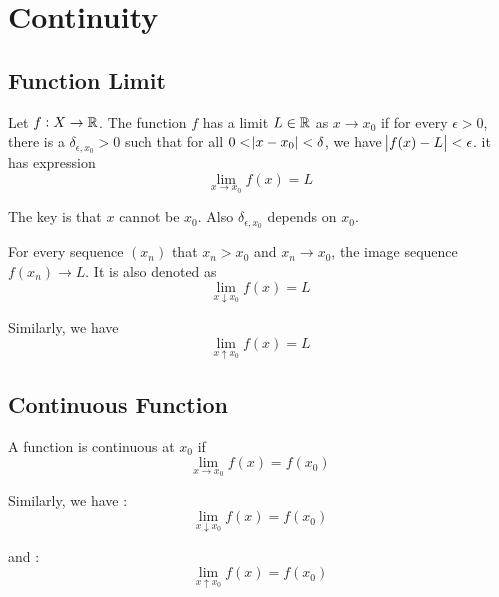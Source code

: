 \chapter{Continuity}

\section{Function Limit}

\begin{definition}
    Let $f: X \rightarrow \mathbb{R}$. The function $f$ has a limit $L\in \mathbb{R}$ as $x \rightarrow x_0$ if for every $\epsilon > 0$, there is a $\delta_{\epsilon, x_0} > 0$ such that for all $0 < \abs{x - x_0} < \delta$, we have $\abs{f(x) - L} < \epsilon$. it has expression
    \begin{equation}
        \lim_{x \rightarrow x_0} f(x) = L
    \end{equation}
    
    The key is that $x$ cannot be $x_0$. Also $\delta_{\epsilon, x_0}$ depends on $x_0$.    
\end{definition}

\begin{definition}
    For every sequence $(x_n)$ that $x_n > x_0$ and $x_n \rightarrow x_0$, the image sequence $f(x_n) \rightarrow L$. It is also denoted as
    \begin{equation}
        \lim_{x \downarrow x_0} f(x) = L
    \end{equation}
    
    Similarly, we have 
    \begin{equation}
        \lim_{x \uparrow x_0} f(x) = L
    \end{equation}
\end{definition}


\section{Continuous Function}

\begin{definition}\label{continuous_function_definition}
    A function is continuous at $x_0$ if 
    \begin{equation}
        \lim_{x \rightarrow x_0} f(x) = f(x_0)
    \end{equation}
    
    Similarly, we have :
    \begin{equation}
        \lim_{x \downarrow x_0} f(x) = f(x_0)
    \end{equation}
    
    and :
    \begin{equation}
        \lim_{x \uparrow x_0} f(x) = f(x_0)
    \end{equation}
\end{definition}

